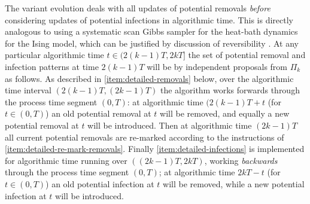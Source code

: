 \documentclass[]{article}
\begin{document}
The variant evolution
deals with all 
updates of potential removals 
\emph{before}
considering updates of
potential infections in algorithmic time.
This is directly analogous to using a systematic scan Gibbs sampler
for the heat-bath dynamics for the Ising model,
which can be justified by
discussion of reversibility
\citep[see][Section 1.4]{Geyer-1999}.%
At any particular algorithmic time \(t\in (2(k{-}1)T, 2kT]\)
the set of potential removal and infection patterns
at time \(2(k{-}1)T\) will be
by independent proposals from \(\Pi_k\) as follows.
As described in \ref{item:detailed-removals} below,
over the algorithmic time interval
\((2(k{-}1)T, (2k{-}1)T)\)
the algorithm works forwards
through the process time segment \((0,T)\): 
at algorithmic time \((2(k{-}1)T+t\) (for \(t\in(0,T)\))
an old potential removal at \(t\)
will be removed, 
and equally
a new potential removal at \(t\)
will be introduced.
Then at
algorithmic time \((2k{-}1)T\)
all current potential removals are re-marked according to the instructions
of \ref{item:detailed-re-mark-removals}.
Finally \ref{item:detailed-infections} is implemented for
algorithmic time running over \(((2k{-}1)T, 2kT)\),
working
\emph{backwards}
through the process time segment \((0,T)\);
at algorithmic time \(2kT-t\)  (for \(t\in(0,T)\))
an old potential infection at \(t\) will be removed, 
while a new potential infection at \(t\) will be introduced.
\end{document}
